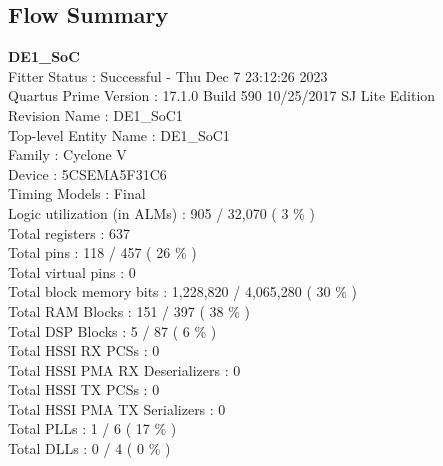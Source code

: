 \documentclass[11pt, titlepage]{article}
\begin{document}
        \subsection{Flow Summary}
            \begin{description}
                \item \textbf{DE1\_SoC} \\
                    Fitter Status : Successful - Thu Dec  7 23:12:26 2023 \\
                    Quartus Prime Version : 17.1.0 Build 590 10/25/2017 SJ Lite Edition \\
                    Revision Name : DE1\_SoC1 \\
                    Top-level Entity Name : DE1\_SoC1 \\
                    Family : Cyclone V \\
                    Device : 5CSEMA5F31C6 \\
                    Timing Models : Final \\
                    Logic utilization (in ALMs) : 905 / 32,070 ( 3 \% ) \\
                    Total registers : 637 \\
                    Total pins : 118 / 457 ( 26 \% ) \\
                    Total virtual pins : 0 \\
                    Total block memory bits : 1,228,820 / 4,065,280 ( 30 \% ) \\
                    Total RAM Blocks : 151 / 397 ( 38 \% ) \\
                    Total DSP Blocks : 5 / 87 ( 6 \% ) \\
                    Total HSSI RX PCSs : 0 \\
                    Total HSSI PMA RX Deserializers : 0 \\
                    Total HSSI TX PCSs : 0 \\
                    Total HSSI PMA TX Serializers : 0 \\
                    Total PLLs : 1 / 6 ( 17 \% ) \\
                    Total DLLs : 0 / 4 ( 0 \% ) \\


\end{description}
\end{document}
